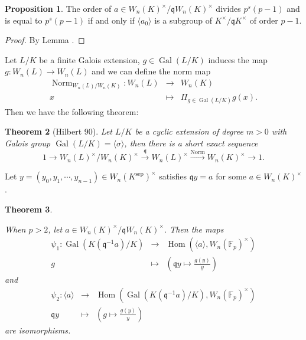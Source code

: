 \documentclass{proc-l}
\newtheorem{theorem}{Theorem}[section]
\theoremstyle{definition}
\newtheorem{example}[theorem]{Example}
\newtheorem{proposition}[theorem]{Proposition}
\theoremstyle{remark}
\numberwithin{equation}{section}
\DeclareMathOperator{\Gal}{Gal}
\DeclareMathOperator{\Hom}{Hom}
\DeclareMathOperator{\Norm}{Norm}
\DeclareMathOperator{\sep}{sep}
\begin{document}
{\begin{proposition}\label{thm1}
The order of $a\in W_n(K)^\times/\mathfrak qW_n(K)^\times$ divides $p^{s}(p-1)$ and is equal to $p^s(p-1)$ if and only if $\langle a_0\rangle$ is a subgroup of $K^\times/\mathfrak qK^\times$ of order $p-1$.
\end{proposition}
\begin{proof}
By Lemma \boxed{\ref {thm-1}}.
\end{proof}
Let $L/K$ be a finite Galois extension, $g\in \Gal(L/K)$ induces the map $g:W_n(L)\rightarrow W_n(L)$ and we can define the norm map
\begin{eqnarray*}
\Norm_{W_n(L)/W_n(K)}:W_n(L)&\rightarrow& W_n(K)\\
x&\mapsto&\Pi_{g\in \Gal(L/K)}g(x).
\end{eqnarray*}
Then we have the following theorem:
\begin{theorem}[Hilbert 90]
    Let $L/K$ be a cyclic extension of degree $m>0$ with Galois group $\Gal(L/K)=\langle\sigma\rangle$, then there is a short exact sequence 
    $$1\rightarrow W_n(L)^\times/W_n(K)^\times\xrightarrow{\mathfrak q} W_n(L)^\times\xrightarrow{\Norm} W_n(K)^\times\rightarrow 1.$$
\end{theorem}


Let $y=(y_0,y_1,\cdots,y_{n-1})\in W_n(K^{\sep})^\times$ satisfies $\mathfrak qy=a$ for some $a\in W_n(K)^\times$. %

\begin{theorem}{\label{038}}
    
    
     When $p>2$, let $a\in W_n(K)^\times/\mathfrak q W_n(K)^\times$. Then the maps
\begin{eqnarray*}
\psi_1:\Gal(K(\mathfrak q^{-1}a)/K)&\rightarrow& \Hom(\langle a\rangle,W_n(\mathbb F_p)^\times)\\
g&\mapsto&(\mathfrak q y\mapsto \frac{g(y)}{y})
\end{eqnarray*}
and
\begin{eqnarray*}
\psi_2:\langle a\rangle&\rightarrow& \Hom(\Gal(K(\mathfrak q^{-1}a)/K),W_n(\mathbb F_p)^\times)\\
\mathfrak qy&\mapsto&(g\mapsto \frac{g(y)}{y})
\end{eqnarray*}
are isomorphisms.  



\end{theorem}}
\end{document}
